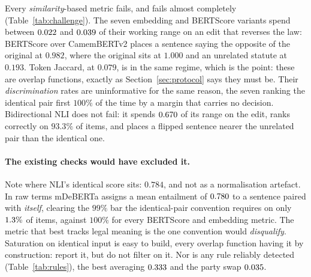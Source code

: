 \documentclass[11pt]{article}
\begin{document}
Every \emph{similarity}-based metric fails, and fails almost completely
(Table~\ref{tab:challenge}). The seven embedding and BERTScore variants spend
between $0.022$ and $0.039$ of their working range on an edit that
reverses the law: BERTScore over CamemBERTv2 places a sentence saying the
opposite of the original at $0.982$, where the original sits at $1.000$ and an
unrelated statute at $0.193$. Token Jaccard, at $0.079$, is in the same regime,
which is the point: these are overlap functions, exactly as
Section~\ref{sec:protocol} says they must be. Their \emph{discrimination} rates
are uninformative for the same reason, the seven ranking the identical pair
first $100\%$ of the time by a margin that carries no decision.
Bidirectional NLI does not fail: it spends $0.670$ of its range on the
edit, ranks correctly on $93.3\%$ of items, and places a flipped sentence nearer
the unrelated pair than the identical one.

\begin{table}[tb]\centering\footnotesize

\caption{Margin over the \nMetricsChallenged\ scorers of
Table~\ref{tab:challenge}; selected rules, same-direction pairs pooled. All
\nRules\ rules are in the supplementary material.}
\label{tab:rules}
\end{table}

\paragraph{The existing checks would have excluded it.}
Note where NLI's identical score sits: $0.784$, and not as a normalisation
artefact. In raw terms mDeBERTa assigns a mean entailment of $0.780$ to a
sentence paired with \emph{itself}, clearing the $99\%$ bar the identical-pair
convention requires on only $1.3\%$ of items, against $100\%$ for
every BERTScore and embedding metric. The metric that best tracks legal meaning
is the one convention would \emph{disqualify}. Saturation on identical input is
easy to build, every overlap function having it by construction: report it, but
do not filter on it. Nor is any rule reliably detected
(Table~\ref{tab:rules}), the best averaging $0.333$ and the party swap
$0.035$.

\begin{table}[tb]\centering\footnotesize

\caption{Calibrated comparison on the \textsc{FrJudge} test split ($\testN$
items), mean over 10 seeds; all ten unsupervised metrics are in the
supplementary material. RMSE$_{\text{raw}}$ is the decimal-scaling protocol in
current use, RMSE$_{\text{cal}}$ the isotonic map of R2.}
\label{tab:baselines}
\end{table}
\end{document}
